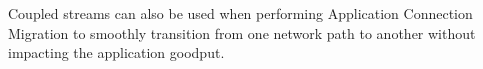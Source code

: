 Coupled streams can also be used when performing Application Connection 
Migration to smoothly transition from one network path to another without 
impacting the application goodput.





